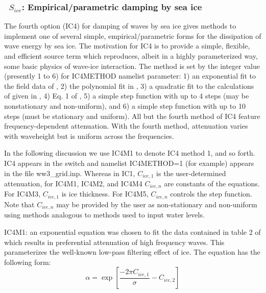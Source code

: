 \vsssub
\subsubsection{~$S_{ice}$: Empirical/parametric damping by sea ice} \label{sec:ICE4}
\vsssub


\noindent
The fourth option ({\code IC4}) for damping of waves by sea ice gives methods to implement one of several simple, empirical/parametric forms for the dissipation of wave energy by sea ice.  The motivation for {\code IC4} is to provide a simple, flexible, and efficient source term which reproduces, albeit in a highly parameterized way, some basic physics of wave-ice interaction. The method is set by the integer value (presently 1 to 6) for {\code IC4METHOD} namelist parameter: 1) an exponential fit to the field data of \cite{art:WAD88}, 2) the polynomial fit in \cite{art:MBK14}, 3) a quadratic fit to the calculations of \cite{art:KM08} given in \cite{art:HT15}, 4) Eq. 1 of \cite{art:Ko14}, 5) a simple step function with up to 4 steps (may be nonstationary and non-uniform), and 6) a simple step function with up to 10 steps (must be stationary and uniform). All but the fourth method of {\code IC4} feature frequency-dependent attenuation. With the fourth method, attenuation varies with waveheight but is uniform across the frequencies. 

In the following discussion we use {\code IC4M1} to denote {\code IC4} method 1, and so forth. {\code IC4} appears in the {\file switch} and namelist {\code IC4METHOD=1} (for example) appears in the file {\file ww3\_grid.inp}. Whereas in {\code IC1}, ${C_{ice,1}}$ is the user-determined attenuation, for {\code IC4M1}, {\code IC4M2}, and {\code IC4M4} ${C_{ice,n}}$ are constants of the equations. For {\code IC4M3}, ${C_{ice,1}}$ is ice thickness. For {\code IC4M5}, ${C_{ice,n}}$ controls the step function. Note that ${C_{ice,n}}$ may be provided by the user as non-stationary and non-uniform using methods analogous to methods used to input water levels.

{\code IC4M1}: an exponential equation was chosen to fit the data contained in table 2 of \cite{art:WAD88} which results in preferential attenuation of high frequency waves. This parameterizes the well-known low-pass filtering effect of ice. The equation has the following form:
\begin{equation}\label{eq:ice1}
  {\alpha} = \exp\left[\frac{-{2\pi}C_{ice, 1}}{{\sigma}} - C_{ice, 2}\right]
\end{equation}

